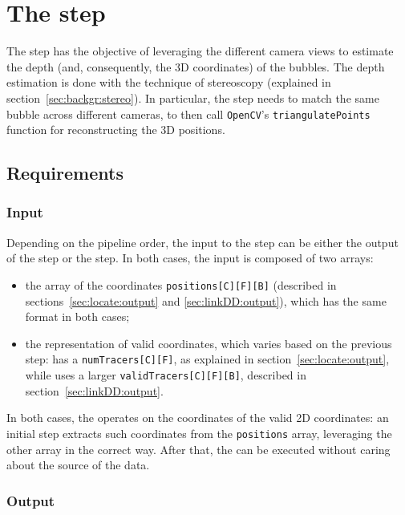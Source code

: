 \chapter{The \match* step}
\label{chap:matching}

The \match* step has the objective of leveraging the different camera views to estimate the depth (and, consequently, the 3D coordinates) of the bubbles.
The depth estimation is done with the technique of stereoscopy (explained in section~\ref{sec:backgr:stereo}).
In particular, the \match* step needs to match the same bubble across different cameras, to then call \texttt{OpenCV}'s \texttt{triangulatePoints} function for reconstructing the 3D positions.

\section{Requirements}

\subsection{Input}

Depending on the pipeline order, the input to the \match* step can be either the output of the \locate* step or the \linkDD* step.
In both cases, the input is composed of two arrays:
\begin{itemize}
	\itemsep 0em
	\item the array of the coordinates \texttt{positions[C][F][B]} (described in sections~\ref{sec:locate:output} and \ref{sec:linkDD:output}), which has the same format in both cases;
	\item the representation of valid coordinates, which varies based on the previous step: \locate* has a \texttt{numTracers[C][F]}, as explained in section~\ref{sec:locate:output}, while \linkDD* uses a larger \texttt{validTracers[C][F][B]}, described in section~\ref{sec:linkDD:output}.
\end{itemize}
In both cases, the \match* operates on the coordinates of the valid 2D coordinates: an initial step extracts such coordinates from the \texttt{positions} array, leveraging the other array in the correct way.
After that, the \match* can be executed without caring about the source of the data.

\subsection{Output}
\label{sec:match:output}


